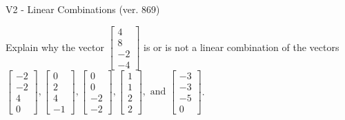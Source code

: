 \begin{exercise}
  \begin{exerciseTitle}V2 - Linear Combinations (ver. 869)\end{exerciseTitle}
  \begin{exerciseStatement}
    Explain why the vector \(\left[\begin{array}{c}
4 \\
8 \\
-2 \\
-4
\end{array}\right]\)  is or is not a linear 
	combination of the vectors \(\left[\begin{array}{c}
-2 \\
-2 \\
4 \\
0
\end{array}\right] , \left[\begin{array}{c}
0 \\
2 \\
4 \\
-1
\end{array}\right] , \left[\begin{array}{c}
0 \\
0 \\
-2 \\
-2
\end{array}\right] , \left[\begin{array}{c}
1 \\
1 \\
2 \\
2
\end{array}\right] , \text{ and } \left[\begin{array}{c}
-3 \\
-3 \\
-5 \\
0
\end{array}\right]\).
	



\end{exerciseStatement}
\end{exercise}
